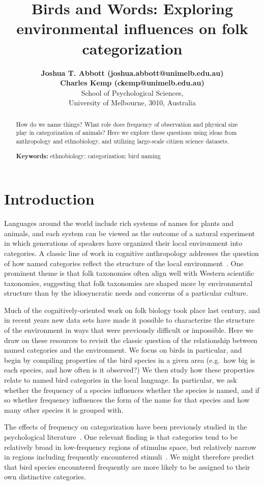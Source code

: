 \documentclass[10pt,letterpaper]{article}
\title{Birds and Words: Exploring environmental influences on folk categorization}
\author{{\large \bf Joshua T. Abbott (joshua.abbott@unimelb.edu.au)} \\
 {\large \bf Charles Kemp (ckemp@unimelb.edu.au)} \\
  School of Psychological Sciences,  \\
  University of Melbourne, 3010, Australia}
\begin{document}
\maketitle


\begin{abstract}
How do we name things? What role does frequency of observation and physical size play in categorization of animals? Here we explore these questions using ideas from anthropology and ethnobiology, and utilizing large-scale citizen science datasets.

\textbf{Keywords:} 
ethnobiology; categorization; bird naming
\end{abstract}


\section{Introduction}



Languages around the world include rich systems of names for plants and animals, and each system can be viewed as the outcome of a natural experiment in which generations of speakers have organized their local environment into categories. A classic line of work in cognitive anthropology addresses the question of how named categories reflect the structure of the local environment~\cite{berlin2014ethnobiological}. One prominent theme is that folk taxonomies often align well with Western scientific taxonomies, suggesting that folk taxonomies are shaped more by environmental structure than by the idiosyncratic needs and concerns of a particular culture. 

Much of the cognitively-oriented work on folk biology took place last century, and in recent years new data sets have made it possible to characterize the structure of the environment in ways that were previously difficult or impossible. Here we draw on these resources to revisit the classic question of the relationship between named categories and the environment. We focus on birds in particular, and begin by compiling properties of the bird species in a given area (e.g.\ how big is each species, and how often is it observed?) We then study how these properties relate to named bird categories in the local language. In particular, we ask whether the frequency of a species influences whether the species is named, and if so whether frequency influences the form of the name for that species and how many other species it is grouped with. 

The effects of frequency on categorization have been previously studied in the psychological literature~\cite{parducci83,nosofsky88,barsalouhl98}.  One relevant finding is that categories tend to be relatively broad in low-frequency regions of stimulus space, but relatively narrow in regions including frequently encountered stimuli~\cite{parducci83}. We might therefore predict that bird species encountered frequently are more likely to be assigned to their own distinctive categories.  
\end{document}
